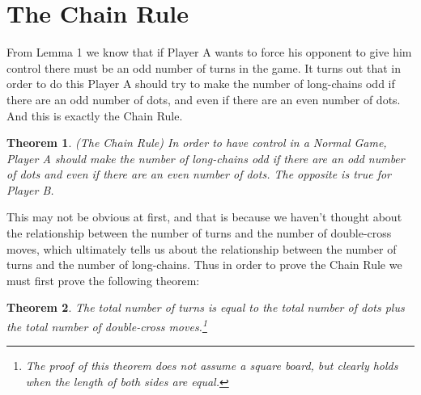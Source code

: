 \documentclass[12pt,twoside]{reedthesis}
\newtheorem{theorem}{Theorem}
\begin{document}
\section{The Chain Rule}
From Lemma 1 we know that if Player A wants to force his opponent to give him control there must be an odd number of turns in the game.  It turns out that in order to do this Player A should try to make the number of long-chains odd if there are an odd number of dots, and even if there are an even number of dots.  And this is exactly the Chain Rule.

\begin{theorem}
\emph{ (The Chain Rule) }
In order to have control in a Normal Game, Player A should make the number of long-chains odd if there are an odd number of dots and even if there are an even number of dots. The opposite is true for Player B.
\end{theorem}

This may not be obvious at first, and that is because we haven't thought about the relationship between the number of turns and the number of double-cross moves, which ultimately tells us about the relationship between the number of turns and the number of long-chains.  Thus in order to prove the Chain Rule we must first prove the following theorem:

\begin{theorem}
The total number of turns is equal to the total number of dots plus the total number of double-cross moves.\footnote[1]{The proof of this theorem does not assume a square board, but clearly holds when the length of both sides are equal.}
\end{theorem}
\end{document}
